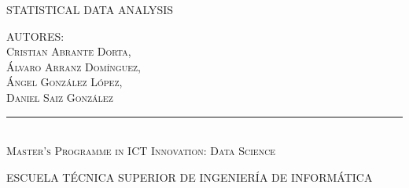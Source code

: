 \begin{titlepage}
\begin{center}
      \vspace{10 mm}\textsc{STATISTICAL DATA ANALYSIS}\par
      \vspace{10 mm}\textsc{AUTORES: \\ Cristian Abrante Dorta, \\ Álvaro Arranz Domínguez, \\ Ángel González López, \\ Daniel Saiz González}\par
		
	\rule{80mm}{0.1mm}\\      
      
	  \vspace{10 mm}
      \textsc{Master's Programme in ICT Innovation: Data Science}\par 
      
      
      \vspace{10 mm}\textsc{ESCUELA TÉCNICA SUPERIOR DE INGENIERÍA DE INFORMÁTICA}		
		\end{center}
\end{titlepage}
